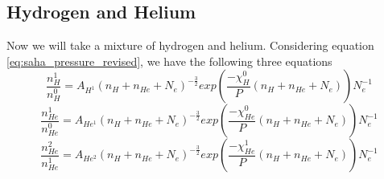 \documentclass{article}
\begin{document}
		\subsection{Hydrogen and Helium}
			Now we will take a mixture of hydrogen and helium. Considering equation 
			\ref{eq:saha_pressure_revised}, we have the following three equations
			\begin{equation} 
				\frac{n^1_H}{n^0_H} = A_{H^{1}} \left( n_H +n_{He} + N_e \right)^{-\frac{3}{2}}
				exp\left(\frac{-\chi^0_H}{P} \left(n_H + n_{He} + N_e \right)\right) N_e^{-1}
			\end{equation}
			\begin{equation} 
				\frac{n^1_{He}}{n^0_{He}} = A_{He^{1}} \left( n_H + n_{He} + N_e \right)^{-\frac{3}{2}}
					exp\left(\frac{-\chi^0_{He}}{P} \left(n_H + n_{He} + N_e \right)\right) N_e^{-1}
			\end{equation}
			\begin{equation} 
				\frac{n^2_{He}}{n^1_{He}} = A_{He^{2}} \left( n_H + n_{He} + N_e \right)^{-\frac{3}{2}}
					exp\left(\frac{-\chi^1_{He}}{P} \left(n_H + n_{He} + N_e \right)\right) N_e^{-1}
			\end{equation}
\end{document}
